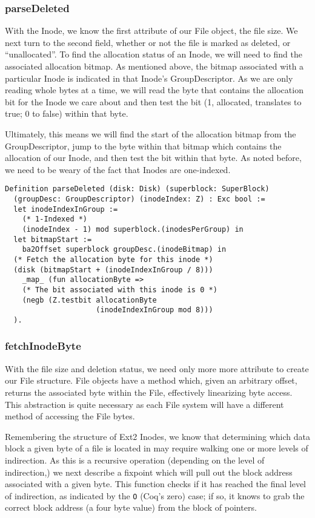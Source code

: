 \documentclass[nocopyrightspace]{sigplanconf}
\begin{document}
\subsubsection{parseDeleted}
With the Inode, we know the first attribute of our File object, the file size.
We next turn to the second field, whether or not the file is marked as
deleted, or ``unallocated''. To find the allocation status of an Inode, we
will need to find the associated allocation bitmap. As mentioned above, the
bitmap associated with a particular Inode is indicated in that Inode's
GroupDescriptor. As we are only reading whole bytes at a time, we will read
the byte that contains the allocation bit for the Inode we care about and then
test the bit (1, allocated, translates to true; 0 to false) within that byte.

Ultimately, this means we will find the start of the allocation bitmap from
the GroupDescriptor, jump to the byte within that bitmap which contains the
allocation of our Inode, and then test the bit within that byte. As noted
before, we need to be weary of the fact that Inodes are one-indexed.

\begin{lstlisting}
Definition parseDeleted (disk: Disk) (superblock: SuperBlock)
  (groupDesc: GroupDescriptor) (inodeIndex: Z) : Exc bool :=
  let inodeIndexInGroup := 
    (* 1-Indexed *)
    (inodeIndex - 1) mod superblock.(inodesPerGroup) in
  let bitmapStart := 
    ba2Offset superblock groupDesc.(inodeBitmap) in
  (* Fetch the allocation byte for this inode *)
  (disk (bitmapStart + (inodeIndexInGroup / 8))) 
    _map_ (fun allocationByte =>
    (* The bit associated with this inode is 0 *)
    (negb (Z.testbit allocationByte 
                     (inodeIndexInGroup mod 8)))
  ).
\end{lstlisting}

\subsubsection{fetchInodeByte}

With the file size and deletion status, we need only more more attribute to
create our File structure. File objects have a method which, given an
arbitrary offset, returns the associated byte within the File, effectively
linearizing byte access. This abstraction is quite necessary as each File
system will have a different method of accessing the File bytes.

Remembering the structure of Ext2 Inodes, we know that determining which data
block a given byte of a file is located in may require walking one or more
levels of indirection. As this is a recursive operation (depending on the
level of indirection,) we next describe a fixpoint which will pull out the
block address associated with a given byte. This function checks if it has
reached the final level of indirection, as indicated by the {\tt O} (Coq's
zero) case; if so, it knows to grab the correct block address (a four byte
value) from the block of pointers.
\end{document}
